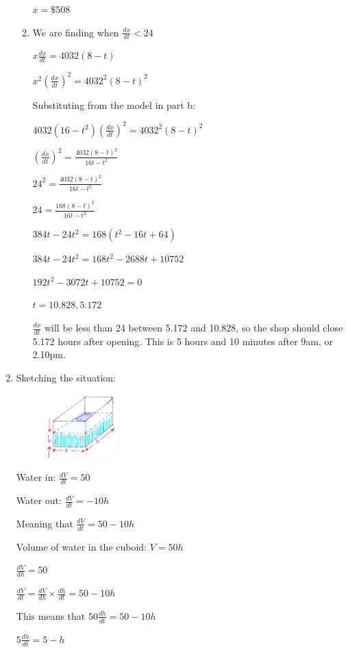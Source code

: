 \documentclass[../main.tex]{subfiles}
\begin{document}
\begin{spacing}{1.5}
\begin{enumerate}[itemsep=0.7cm]
\begin{enumerate}[itemsep=0.7cm]
        $x=\$508$

        \item 
        We are finding when $\frac{dx}{dt}<24$

        $x\frac{dx}{dt}=4032(8-t)$

        $x^2(\frac{dx}{dt})^2=4032^2(8-t)^2$

        Substituting from the model in part b:

        $4032(16-t^2)(\frac{dx}{dt})^2=4032^2(8-t)^2$

        $(\frac{dx}{dt})^2=\frac{4032(8-t)^2}{16t-t^2}$

        $24^2=\frac{4032(8-t)^2}{16t-t^2}$

        $24=\frac{168(8-t)^2}{16t-t^2}$

        $384t-24t^2=168(t^2-16t+64)$

        $384t-24t^2=168t^2-2688t+10752$

        $192t^2-3072t+10752=0$

        $t=10.828, 5.172$

        $\frac{dx}{dt}$ will be less than 24 between 5.172 and 10.828, so the shop should close 5.172 hours after opening. This is 5 hours and 10 minutes after 9am, or 2.10pm.

    \end{enumerate}

    \item 
    Sketching the situation:
    \begin{figure}[h]
        \centering
        \includegraphics{images/diffeqns.png}
    \end{figure}

    Water in: $\frac{dV}{dt}=50$

    Water out: $\frac{dV}{dt}=-10h$

    Meaning that $\frac{dV}{dt}=50-10h$

    Volume of water in the cuboid: $V=50h$

    $\frac{dV}{dh}=50$

    $\frac{dV}{dt}=\frac{dV}{dh}\times \frac{dh}{dt}=50-10h$

    This means that $50\frac{dh}{dt}=50-10h$

    $5\frac{dh}{dt}=5-h$


\end{enumerate}
\end{spacing}
\end{document}
